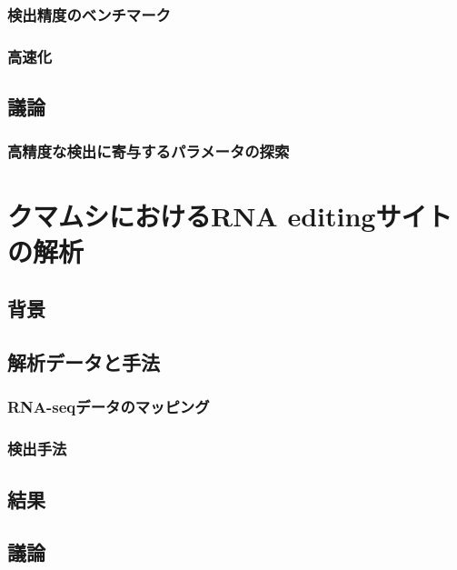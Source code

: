 \subsection{検出精度のベンチマーク}
\subsection{高速化}

\section{議論}
\subsection{高精度な検出に寄与するパラメータの探索}

\chapter{クマムシにおけるRNA editingサイトの解析}
\section{背景}
\section{解析データと手法}
\subsection{RNA-seqデータのマッピング}
\subsection{検出手法}
\section{結果}
\section{議論}

